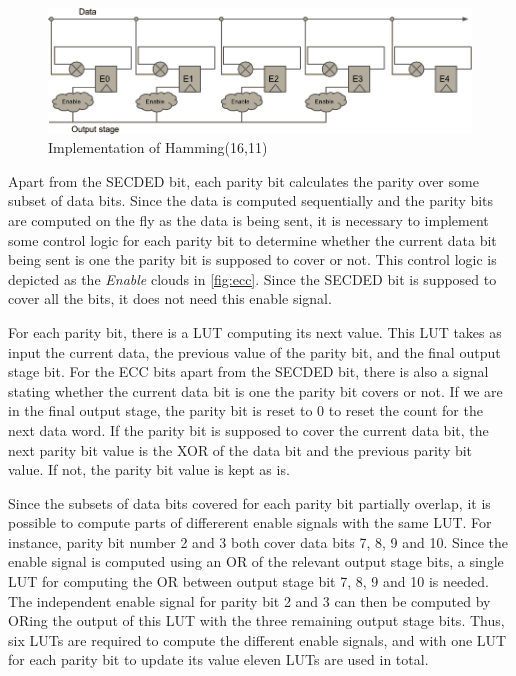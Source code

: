 \begin{figure}
\includegraphics[width=15cm]{implementation/fig_ecc}
\caption{Implementation of Hamming(16,11)}
\label{fig:ecc}
\end{figure}

Apart from the SECDED bit, each parity bit calculates the parity over
some subset of data bits. Since the data is computed sequentially and
the parity bits are computed on the fly as the data is being sent, it
is necessary to implement some control logic for each parity bit to
determine whether the current data bit being sent is one the parity
bit is supposed to cover or not. This control logic is depicted as the
\textit{Enable} clouds in \autoref{fig:ecc}. Since the SECDED bit is
supposed to cover all the bits, it does not need this enable signal. 

For each parity bit, there is a LUT computing its next value. This LUT
takes as input the current data, the previous value of the parity bit,
and the final output stage bit. For the ECC bits apart from the SECDED
bit, there is also a signal stating whether the current data bit is
one the parity bit covers or not. If we are in the final output stage,
the parity bit is reset to 0 to reset the count for the next data
word. If the parity bit is supposed to cover the current data bit, the
next parity bit value is the XOR of the data bit and the previous
parity bit value. If not, the parity bit value is kept as is. 

Since the subsets of data bits covered for each parity bit partially
overlap, it is possible to compute parts of differerent enable signals
with the same LUT. For instance, parity bit number 2 and 3 both cover
data bits 7, 8, 9 and 10. Since the enable signal is computed using an
OR of the relevant output stage bits, a single LUT for computing the
OR between output stage bit 7, 8, 9 and 10 is needed. The independent
enable signal for parity bit 2 and 3 can then be computed by ORing the
output of this LUT with the three remaining output stage bits. Thus,
six LUTs are required to compute the different enable signals, and
with one LUT for each parity bit to update its value eleven LUTs are
used in total.

